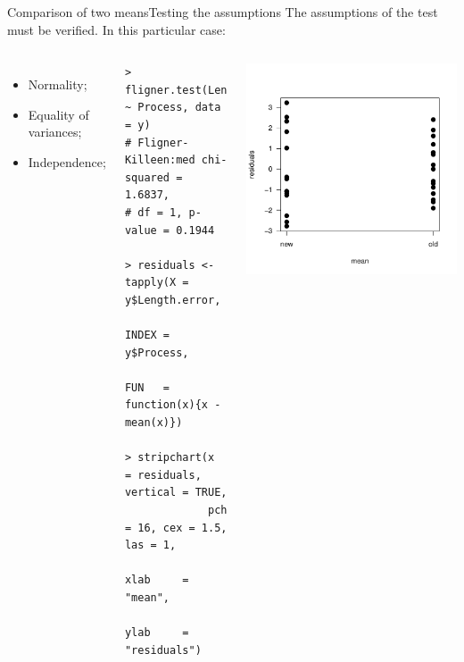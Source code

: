 \begin{frame}[fragile]{Comparison of two means}{Testing the assumptions}
The assumptions of the test must be verified. In this particular case:

\begin{columns}[T]
  {\smaller
    \begin{itemize}
      \item Normality;
      \item \alert{Equality of variances};
      \item Independence;
    \end{itemize}
    {\smaller
\begin{verbatim}
> fligner.test(Length.error ~ Process, data = y)
# Fligner-Killeen:med chi-squared = 1.6837,
# df = 1, p-value = 0.1944

> residuals <- tapply(X = y$Length.error,
               INDEX = y$Process,
               FUN   = function(x){x - mean(x)})

> stripchart(x        = residuals, vertical = TRUE,
             pch      = 16, cex = 1.5, las = 1,
             xlab     = "mean",
             ylab     = "residuals")
\end{verbatim}}}
\includegraphics[width=\textwidth]{../img/steelrodsvar.pdf}
\end{columns}
\end{frame}

